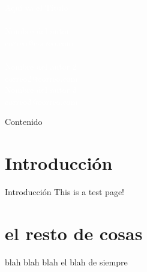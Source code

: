 \documentclass[12pt,spanish]{beamer}
\begin{document}
{
\begin{frame}
    \begin{minipage}[t]{0.8\linewidth} %
{\Huge \textcolor{white}{Aquí va el Título}} %
\\
\\
{ \textcolor{white}{Nombre del autor}} %
\\
{ \textcolor{white}{correo@correo.com}}
\\
\\
{ \textcolor{white}{Nombre del autor 2}} %
\\
{ \textcolor{white}{correo2@correo.com}}
\\

{ \textcolor{white}{Nombre del autor 3}} %
\\
{ \textcolor{white}{correo3@correo.com}}

\end{minipage}
\end{frame}
}


\begin{frame}{Contenido}
\tableofcontents
\end{frame}


\section{Introducción}
\begin{frame}{Introducción}
  This is a test page!
\end{frame}

\section{el resto de cosas}

\begin{frame}{blah blah blah}
  el blah de siempre
\end{frame}
\end{document}
